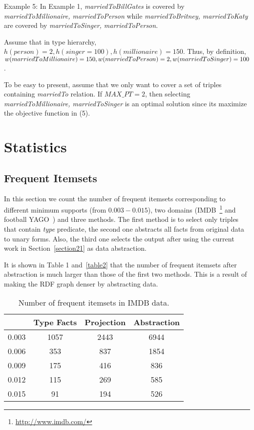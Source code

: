 \documentclass{acm_proc_article-sp}
\begin{document}
Example 5: In Example 1, \textit{marriedToBillGates} is covered by \textit{marriedToMillionaire, marriedToPerson} while \textit{marriedToBritney, marriedToKaty} are covered by \textit{marriedToSinger, marriedToPerson}.

Assume that in type hierarchy, $h(person) = 2, h(singer = 100), h(millionaire) = 150$. Thus, by definition, $w(married\\ToMillionaire) = 150, w(marriedToPerson) = 2, \\w(marriedToSinger) = 100$.

To be easy to present, assume that we only want to cover a set of triples containing \textit{marriedTo} relation. If $MAX\_PT = 2$, then selecting \textit{marriedToMillionaire, marriedToSinger} is an optimal solution since its maximize the objective function in (5).

\section{Statistics}
\label{section3}

\subsection{Frequent Itemsets}

In this section we count the number of frequent itemsets corresponding to different minimum supports (from $0.003 - 0.015$), two domains (IMDB~\footnote{\url{http://www.imdb.com/}} and football YAGO~\cite{ref4}) and three methods. The first method is to select only triples that contain \textit{type} predicate, the second one abstracts all facts from original data to unary forms. Also, the third one selects the output after using the current work in Section~\ref{section21} as data abstraction.

It is shown in Table 1 and~\ref{table2} that the number of frequent itemsets after abstraction is much larger than those of the first two methods. This is a result of making the RDF graph denser by abstracting data.

\begin{table}[ht]
\label{table1}
\caption{Number of frequent itemsets in IMDB data.}
\begin{center}
\begin{tabular}{ |c|c|c|c| } 
\hline
 & Type Facts & Projection & Abstraction\\
\hline
0.003 & 1057 & 2443 & 6944 \\
0.006 & 353 & 837 & 1854 \\
0.009 & 175 & 416 & 836 \\
0.012 & 115 & 269 & 585 \\
0.015 & 91 & 194 & 526 \\
\hline
\end{tabular}
\end{center}
\end{table}
\end{document}

